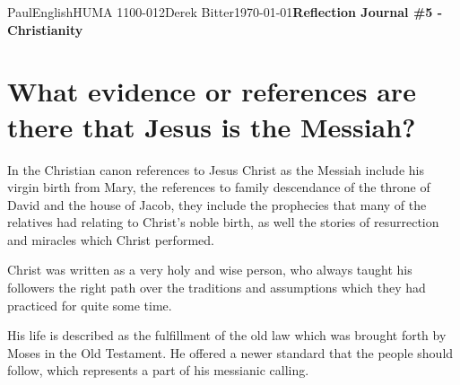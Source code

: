 \documentclass[12pt,letterpaper]{article}
\begin{document}
\begin{mla}{Paul}{English}{HUMA 1100-012}{Derek Bitter}{\today}{\textbf{Reflection Journal \#5 - Christianity}}

\section{What evidence or references are there that Jesus is the Messiah?}





In the Christian canon references to Jesus Christ as the Messiah
include his virgin birth from Mary, the references to family
descendance of the throne of David and the house of Jacob, they
include the prophecies that many of the relatives had relating to
Christ's noble birth, as well the stories of resurrection and miracles
which Christ performed.

Christ was written as a very holy and wise person, who always taught
his followers the right path over the traditions and assumptions which
they had practiced for quite some time.

His life is described as the fulfillment of the old law which was
brought forth by Moses in the Old Testament. He offered a newer
standard that the people should follow, which represents a part of his
messianic calling.


\end{mla}
\end{document}

